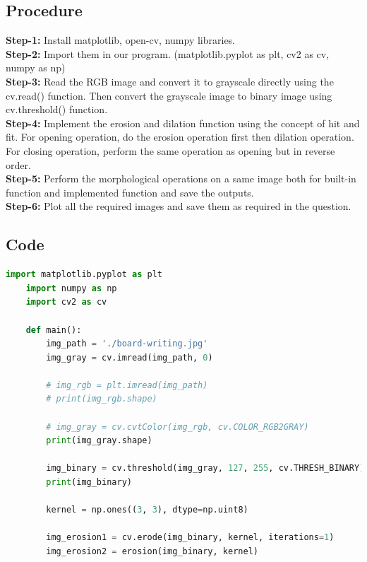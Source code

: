 \documentclass{article}
\begin{document}
{    \subsection{Procedure}
    \textbf{Step-1:}
    Install matplotlib, open-cv, numpy libraries.\\
    \textbf{Step-2:}
    Import them in our program. (matplotlib.pyplot as plt, cv2 as cv, numpy as np)\\
    \textbf{Step-3:}
    Read the RGB image and convert it to grayscale directly using the cv.read() function. Then convert the grayscale image to binary image using cv.threshold() function.\\
    \textbf{Step-4:}
    Implement the erosion and dilation function using the concept of hit and fit. For opening operation, do the erosion operation first then dilation operation. For closing operation, perform the same operation as opening but in reverse order.\\
    \textbf{Step-5:}
    Perform the morphological operations on a same image both for built-in function and implemented function and save the outputs.\\
    \textbf{Step-6:}
    Plot all the required images and save them as required in the question.\\
    
    \subsection{Code}
    \lstset{style=mystyle}
    \begin{lstlisting}[language=Python, caption=Code for implementing different morphological operations as functions for a binary image]
    import matplotlib.pyplot as plt
    import numpy as np 
    import cv2 as cv
    
    def main():
        img_path = './board-writing.jpg'
        img_gray = cv.imread(img_path, 0)
        
        # img_rgb = plt.imread(img_path)
        # print(img_rgb.shape)
    
        # img_gray = cv.cvtColor(img_rgb, cv.COLOR_RGB2GRAY)
        print(img_gray.shape)
    
        img_binary = cv.threshold(img_gray, 127, 255, cv.THRESH_BINARY)[1]
        print(img_binary)
    
        kernel = np.ones((3, 3), dtype=np.uint8) 
    
        img_erosion1 = cv.erode(img_binary, kernel, iterations=1)
        img_erosion2 = erosion(img_binary, kernel)
    

\end{lstlisting}}
\end{document}
